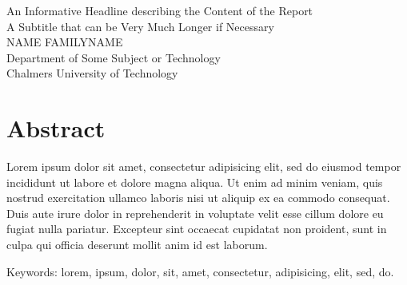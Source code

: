 An Informative Headline describing the Content of the Report\\
A Subtitle that can be Very Much Longer if Necessary\\
NAME FAMILYNAME\\
Department of Some Subject or Technology\\
Chalmers University of Technology \setlength{\parskip}{0.5cm}

\thispagestyle{plain}			%
\setlength{\parskip}{0pt plus 1.0pt}
\section*{Abstract}
Lorem ipsum dolor sit amet, consectetur adipisicing elit, sed do eiusmod tempor incididunt ut labore et dolore magna aliqua. Ut enim ad minim veniam, quis nostrud exercitation ullamco laboris nisi ut aliquip ex ea commodo consequat. Duis aute irure dolor in reprehenderit in voluptate velit esse cillum dolore eu fugiat nulla pariatur. Excepteur sint occaecat cupidatat non proident, sunt in culpa qui officia deserunt mollit anim id est laborum.

\vfill
Keywords: lorem, ipsum, dolor, sit, amet, consectetur, adipisicing, elit, sed, do.

\newpage				%
\thispagestyle{empty}
\mbox{}